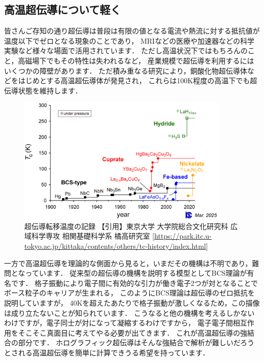 \documentclass[b5paper,11pt,dvipdfmx]{jsarticle}
\numberwithin{equation}{section}
\theoremstyle{definition}
\begin{document}
\subsection{高温超伝導について軽く}
皆さんご存知の通り超伝導は普段は有限の値となる電流や熱流に対する抵抗値が温度以下でゼロとなる現象のことであり，
MRIなどの医療や加速器などの科学実験など様々な場面で活用されています．
ただし高温状況下ではもちろんのこと，高磁場下でもその特性は失われるなど，
産業規模で超伝導を利用するにはいくつかの障壁があります．
ただ積み重なる研究により，銅酸化物超伝導体などをはじめとする高温超伝導体が発見され，
これらは100K程度の高温下でも超伝導状態を維持します．
\begin{figure}[t]
    \centering
    \includegraphics[width=0.9\textwidth]{tc-history_2025.jpg}
    \caption{超伝導転移温度の記録 【引用】東京大学 大学院総合文化研究科 広域科学専攻 相関基礎科学系 橘高研究室 [\url{https://park.itc.u-tokyo.ac.jp/kittaka/contents/others/tc-history/index.html}]}
    \label{fig:tc-history}
\end{figure}
一方で高温超伝導を理論的な側面から見ると，いまだその機構は不明であり，難問となっています．
従来型の超伝導の機構を説明する模型としてBCS理論が有名です．
格子振動により電子間に有効的な引力が働き電子2つが対となることでボース粒子のキャリアが生まれる，
このようにBCS理論は超伝導のゼロ抵抗を説明していますが，
40Kを超えたあたりで格子振動が激しくなるため，この描像は成り立たないことが知られています．
こうなると他の機構を考えるしかないわけですが，電子同士が対になって凝縮するわけですから，
電子電子間相互作用をそこそこ真面目に考えてやる必要が出てきます．
これが高温超伝導の強結合の部分です．
ホログラフィック超伝導はそんな強結合で解析が難しいだろうとされる高温超伝導を簡単に計算できうる希望を持っています．
\end{document}
